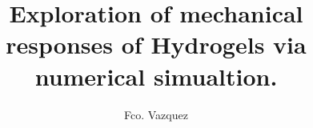 \documentclass{tufte-style-thesis}
\title{Exploration of mechanical responses of Hydrogels via numerical simualtion.}
\author{Fco. Vazquez}
\begin{document}
\justifying   



\normalsize
\maketitle
\tableofcontents




\citep{*}
\end{document}
